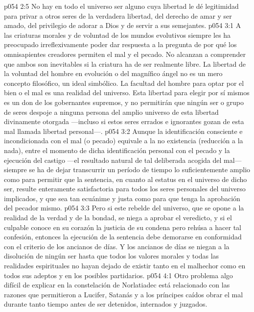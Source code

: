 \vs p054 2:5 \pc No hay en todo el universo ser alguno cuya libertad le dé legitimidad para privar a otros seres de la verdadera libertad, del derecho de amar y ser amado, del privilegio de adorar a Dios y de servir a sus semejantes.
\vs p054 3:1 A las criaturas morales y de voluntad de los mundos evolutivos siempre les ha preocupado irreflexivamente poder dar respuesta a la pregunta de por qué los omnisapientes creadores permiten el mal y el pecado. No alcanzan a comprender que ambos son inevitables si la criatura ha de ser realmente libre. La libertad de la voluntad del hombre en evolución o del magnífico ángel no es un mero concepto filosófico, un ideal simbólico. La facultad del hombre para optar por el bien o el mal es una realidad del universo. Esta libertad para elegir por sí mismos es un don de los gobernantes supremos, y no permitirán que ningún ser o grupo de seres despoje a ninguna persona del amplio universo de esta libertad divinamente otorgada ---incluso si estos seres errados e ignorantes gozan de esta mal llamada libertad personal---.
\vs p054 3:2 Aunque la identificación consciente e incondicionada con el mal (o pecado) equivale a la no existencia (reducción a la nada), entre el momento de dicha identificación personal con el pecado y la ejecución del castigo ---el resultado natural de tal deliberada acogida del mal--- siempre se ha de dejar transcurrir un período de tiempo lo suficientemente amplio como para permitir que la sentencia, en cuanto al estatus en el universo de dicho ser, resulte enteramente satisfactoria para todos los seres personales del universo implicados, y que sea tan ecuánime y justa como para que tenga la aprobación del pecador mismo.
\vs p054 3:3 Pero si este rebelde del universo, que se opone a la realidad de la verdad y de la bondad, se niega a aprobar el veredicto, y si el culpable conoce en su corazón la justicia de su condena pero rehúsa a hacer tal confesión, entonces la ejecución de la sentencia debe demorarse en conformidad con el criterio de los ancianos de días. Y los ancianos de días se niegan a la disolución de ningún ser hasta que todos los valores morales y todas las realidades espirituales no hayan dejado de existir tanto en el malhechor como en todos sus adeptos y en los posibles partidarios.
\vs p054 4:1 Otro problema algo difícil de explicar en la constelación de Norlatiadec está relacionado con las razones que permitieron a Lucifer, Satanás y a los príncipes caídos obrar el mal durante tanto tiempo antes de ser detenidos, internados y juzgados.
